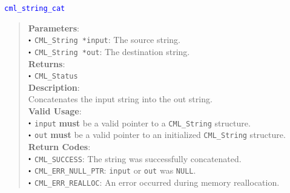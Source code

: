 \documentclass[a4paper,oneside,10pt]{article}
\newcommand{\function}[1]{
  \noindent\textcolor{blue}{\texttt{#1}}
  \vspace{-0.3em}
}
\renewcommand{\dot}{\raisebox{0.3ex}{\scalebox{0.6}{$\bullet$}}}
\theoremstyle{definition}
\begin{document}
\function{cml\_string\_cat}
\begin{quote}
  \textbf{Parameters}: \\
  $\dot$ \texttt{CML\_String *input}: The source string. \\
  $\dot$ \texttt{CML\_String *out}: The destination string. \\
  \textbf{Returns}: \\
  $\dot$ \texttt{CML\_Status} \\

  \vspace{-0.75em}
  \textbf{Description}: \\
  Concatenates the input string into the out string. \\

  \vspace{-0.75em}
  \textbf{Valid Usage}: \\
  $\dot$ \texttt{input} \textbf{must} be a valid pointer to a \texttt{CML\_String} structure. \\
  $\dot$ \texttt{out} \textbf{must} be a valid pointer to an initialized \texttt{CML\_String} structure. \\

  \vspace{-0.75em}
  \textbf{Return Codes}: \\
  $\dot$ \texttt{CML\_SUCCESS}: The string was successfully concatenated. \\
  $\dot$ \texttt{CML\_ERR\_NULL\_PTR}: \texttt{input} or \texttt{out} was \texttt{NULL}. \\
  $\dot$ \texttt{CML\_ERR\_REALLOC}: An error occurred during memory reallocation. \\
\end{quote}
\end{document}
